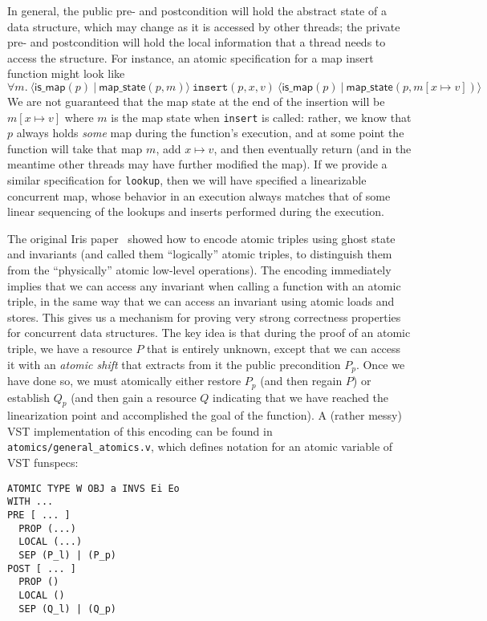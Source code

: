 \documentclass[11pt]{article}
\begin{document}
In general, the public pre- and postcondition will hold the abstract state of a data structure, which may change as it is accessed by other threads; the private pre- and postcondition will hold the local information that a thread needs to access the structure. For instance, an atomic specification for a map insert function might look like $$\forall m.\ \langle \mathsf{is\_map}(p)\ |\ \mathsf{map\_state}(p, m)\rangle\ \texttt{insert}(p, x, v)\ \langle \mathsf{is\_map}(p)\ |\ \mathsf{map\_state}(p, m[x \mapsto v])\rangle$$
We are not guaranteed that the map state at the end of the insertion will be $m[x \mapsto v]$ where $m$ is the map state when \texttt{insert} is called: rather, we know that $p$ always holds \emph{some} map during the function's execution, and at some point the function will take that map $m$, add $x \mapsto v$, and then eventually return (and in the meantime other threads may have further modified the map). If we provide a similar specification for \texttt{lookup}, then we will have specified a linearizable concurrent map, whose behavior in an execution always matches that of some linear sequencing of the lookups and inserts performed during the execution.

The original Iris paper~\cite{iris1} showed how to encode atomic triples using ghost state and invariants (and called them ``logically'' atomic triples, to distinguish them from the ``physically'' atomic low-level operations). The encoding immediately implies that we can access any invariant when calling a function with an atomic triple, in the same way that we can access an invariant using atomic loads and stores. This gives us a mechanism for proving very strong correctness properties for concurrent data structures. The key idea is that during the proof of an atomic triple, we have a resource $P$ that is entirely unknown, except that we can access it with an \emph{atomic shift} that extracts from it the public precondition $P_p$. Once we have done so, we must atomically either restore $P_p$ (and then regain $P$) or establish $Q_p$ (and then gain a resource $Q$ indicating that we have reached the linearization point and accomplished the goal of the function). A (rather messy) VST implementation of this encoding can be found in \texttt{atomics/general\_atomics.v}, which defines notation for an atomic variable of VST funspecs:

\begin{verbatim}
ATOMIC TYPE W OBJ a INVS Ei Eo
WITH ...
PRE [ ... ]
  PROP (...)
  LOCAL (...)
  SEP (P_l) | (P_p)
POST [ ... ]
  PROP ()
  LOCAL ()
  SEP (Q_l) | (Q_p)
\end{verbatim}
\end{document}
